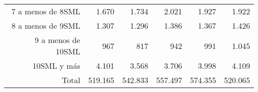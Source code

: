 \begin{tabular}{llllll}
\multicolumn{1}{r}{7 a menos de 8SML\hspace{1em}} &
  \multicolumn{1}{|r}{1.670} &
  \multicolumn{1}{r}{1.734} &
  \multicolumn{1}{r}{2.021} &
  \multicolumn{1}{r}{1.927} &
  \multicolumn{1}{r}{1.922} \\
\multicolumn{1}{r}{8 a menos de 9SML\hspace{1em}} &
  \multicolumn{1}{|r}{1.307} &
  \multicolumn{1}{r}{1.296} &
  \multicolumn{1}{r}{1.386} &
  \multicolumn{1}{r}{1.367} &
  \multicolumn{1}{r}{1.426} \\
\multicolumn{1}{r}{9 a menos de 10SML\hspace{1em}} &
  \multicolumn{1}{|r}{967} &
  \multicolumn{1}{r}{817} &
  \multicolumn{1}{r}{942} &
  \multicolumn{1}{r}{991} &
  \multicolumn{1}{r}{1.045} \\
\multicolumn{1}{r}{10SML y más\hspace{1em}} &
  \multicolumn{1}{|r}{4.101} &
  \multicolumn{1}{r}{3.568} &
  \multicolumn{1}{r}{3.706} &
  \multicolumn{1}{r}{3.998} &
  \multicolumn{1}{r}{4.109} \\
\multicolumn{1}{r}{Total\hspace{1em}} &
  \multicolumn{1}{|r}{519.165} &
  \multicolumn{1}{r}{542.833} &
  \multicolumn{1}{r}{557.497} &
  \multicolumn{1}{r}{574.355} &
  \multicolumn{1}{r}{520.065} \\
\cline{1-6}
\end{tabular}
